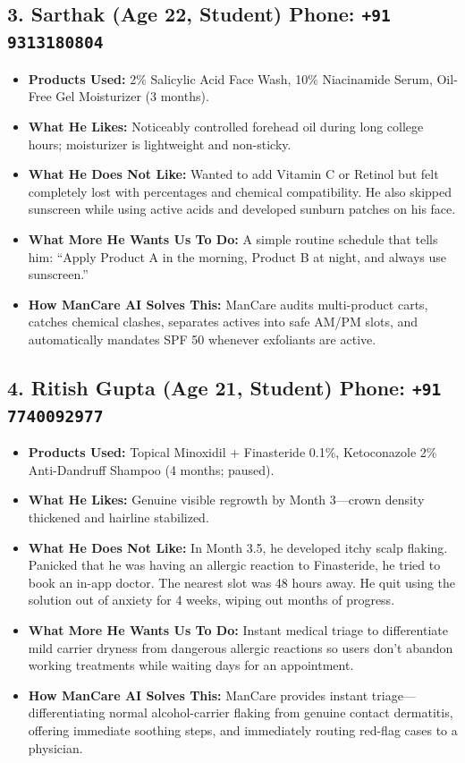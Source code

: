 \documentclass[11pt,a4paper]{article}
\begin{document}
\subsection*{3. Sarthak (Age 22, Student) \hfill \normalfont\small Phone: \texttt{+91 9313180804}}
\begin{itemize}
    \item \textbf{Products Used:} 2\% Salicylic Acid Face Wash, 10\% Niacinamide Serum, Oil-Free Gel Moisturizer (3 months).
    \item \textbf{What He Likes:} Noticeably controlled forehead oil during long college hours; moisturizer is lightweight and non-sticky.
    \item \textbf{What He Does Not Like:} Wanted to add Vitamin C or Retinol but felt completely lost with percentages and chemical compatibility. He also skipped sunscreen while using active acids and developed sunburn patches on his face.
    \item \textbf{What More He Wants Us To Do:} A simple routine schedule that tells him: ``Apply Product A in the morning, Product B at night, and always use sunscreen.''
    \item \textbf{\color{brandteal}How ManCare AI Solves This:} ManCare audits multi-product carts, catches chemical clashes, separates actives into safe AM/PM slots, and automatically mandates SPF 50 whenever exfoliants are active.
\end{itemize}

\subsection*{4. Ritish Gupta (Age 21, Student) \hfill \normalfont\small Phone: \texttt{+91 7740092977}}
\begin{itemize}
    \item \textbf{Products Used:} Topical Minoxidil + Finasteride 0.1\%, Ketoconazole 2\% Anti-Dandruff Shampoo (4 months; paused).
    \item \textbf{What He Likes:} Genuine visible regrowth by Month 3---crown density thickened and hairline stabilized.
    \item \textbf{What He Does Not Like:} In Month 3.5, he developed itchy scalp flaking. Panicked that he was having an allergic reaction to Finasteride, he tried to book an in-app doctor. The nearest slot was 48 hours away. He quit using the solution out of anxiety for 4 weeks, wiping out months of progress.
    \item \textbf{What More He Wants Us To Do:} Instant medical triage to differentiate mild carrier dryness from dangerous allergic reactions so users don't abandon working treatments while waiting days for an appointment.
    \item \textbf{\color{brandteal}How ManCare AI Solves This:} ManCare provides instant triage---differentiating normal alcohol-carrier flaking from genuine contact dermatitis, offering immediate soothing steps, and immediately routing red-flag cases to a physician.
\end{itemize}
\end{document}
